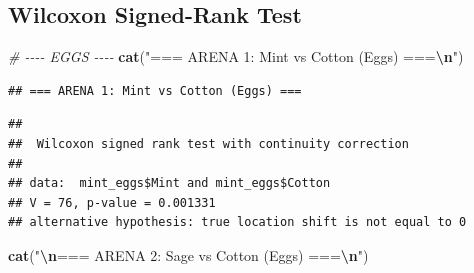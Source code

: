 \documentclass[
]{article}
\newenvironment{Shaded}{\begin{snugshade}}{\end{snugshade}}
\newcommand{\AttributeTok}[1]{\textcolor[rgb]{0.13,0.29,0.53}{#1}}
\newcommand{\CommentTok}[1]{\textcolor[rgb]{0.56,0.35,0.01}{\textit{#1}}}
\newcommand{\ConstantTok}[1]{\textcolor[rgb]{0.56,0.35,0.01}{#1}}
\newcommand{\FunctionTok}[1]{\textcolor[rgb]{0.13,0.29,0.53}{\textbf{#1}}}
\newcommand{\NormalTok}[1]{#1}
\newcommand{\OtherTok}[1]{\textcolor[rgb]{0.56,0.35,0.01}{#1}}
\newcommand{\SpecialCharTok}[1]{\textcolor[rgb]{0.81,0.36,0.00}{\textbf{#1}}}
\newcommand{\StringTok}[1]{\textcolor[rgb]{0.31,0.60,0.02}{#1}}
\begin{document}
\subsection{Wilcoxon Signed-Rank Test}\label{wilcoxon-signed-rank-test}

\begin{Shaded}
\begin{Highlighting}[]
\CommentTok{\# {-}{-}{-}{-} EGGS {-}{-}{-}{-}}
 \FunctionTok{cat}\NormalTok{(}\StringTok{"=== ARENA 1: Mint vs Cotton (Eggs) ===}\SpecialCharTok{\textbackslash{}n}\StringTok{"}\NormalTok{)}
\end{Highlighting}
\end{Shaded}

\begin{verbatim}
## === ARENA 1: Mint vs Cotton (Eggs) ===
\end{verbatim}

\begin{Shaded}
\end{Shaded}

\begin{verbatim}
## 
##  Wilcoxon signed rank test with continuity correction
## 
## data:  mint_eggs$Mint and mint_eggs$Cotton
## V = 76, p-value = 0.001331
## alternative hypothesis: true location shift is not equal to 0
\end{verbatim}

\begin{Shaded}
\begin{Highlighting}[]
\FunctionTok{cat}\NormalTok{(}\StringTok{"}\SpecialCharTok{\textbackslash{}n}\StringTok{=== ARENA 2: Sage vs Cotton (Eggs) ===}\SpecialCharTok{\textbackslash{}n}\StringTok{"}\NormalTok{)}
\end{Highlighting}
\end{Shaded}
\end{document}
